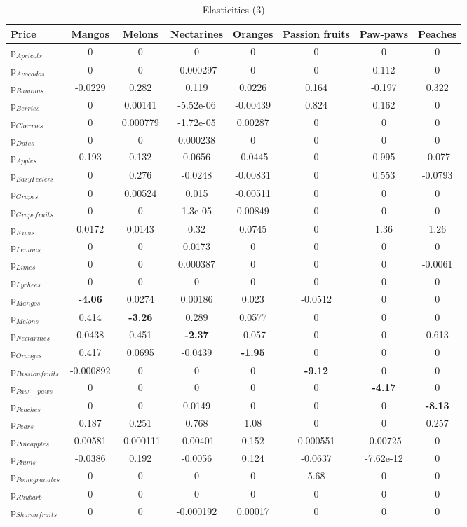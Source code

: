 \documentclass[11pt]{article}
\begin{document}
\begin{table}[h]
\caption{Elasticities (3)}
\label{table:elasticities 3}
\begin{center}
\begin{tabular}{lccccccc} \hline \hline
Price &Mangos &Melons &Nectarines &Oranges &Passion fruits &Paw-paws &Peaches \\ \hline
p$_{Apricots}$ &0 &0 &0 &0 &0 &0 &0 \\
p$_{Avocados}$ &0 &0 &-0.000297 &0 &0 &0.112 &0 \\
p$_{Bananas}$ &-0.0229 &0.282 &0.119 &0.0226 &0.164 &-0.197 &0.322 \\
p$_{Berries}$ &0 &0.00141 &-5.52e-06 &-0.00439 &0.824 &0.162 &0 \\
p$_{Cherries}$ &0 &0.000779 &-1.72e-05 &0.00287 &0 &0 &0 \\
p$_{Dates}$ &0 &0 &0.000238 &0 &0 &0 &0 \\
p$_{Apples}$ &0.193 &0.132 &0.0656 &-0.0445 &0 &0.995 &-0.077 \\
p$_{Easy Peelers}$ &0 &0.276 &-0.0248 &-0.00831 &0 &0.553 &-0.0793 \\
p$_{Grapes}$ &0 &0.00524 &0.015 &-0.00511 &0 &0 &0 \\
p$_{Grapefruits}$ &0 &0 &1.3e-05 &0.00849 &0 &0 &0 \\
p$_{Kiwis}$ &0.0172 &0.0143 &0.32 &0.0745 &0 &1.36 &1.26 \\
p$_{Lemons}$ &0 &0 &0.0173 &0 &0 &0 &0 \\
p$_{Limes}$ &0 &0 &0.000387 &0 &0 &0 &-0.0061 \\
p$_{Lychees}$ &0 &0 &0 &0 &0 &0 &0 \\
p$_{Mangos}$ &\textbf{-4.06} &0.0274 &0.00186 &0.023 &-0.0512 &0 &0 \\
p$_{Melons}$ &0.414 &\textbf{-3.26} &0.289 &0.0577 &0 &0 &0 \\
p$_{Nectarines}$ &0.0438 &0.451 &\textbf{-2.37} &-0.057 &0 &0 &0.613 \\
p$_{Oranges}$ &0.417 &0.0695 &-0.0439 &\textbf{-1.95} &0 &0 &0 \\
p$_{Passion fruits}$ &-0.000892 &0 &0 &0 &\textbf{-9.12} &0 &0 \\
p$_{Paw-paws}$ &0 &0 &0 &0 &0 &\textbf{-4.17} &0 \\
p$_{Peaches}$ &0 &0 &0.0149 &0 &0 &0 &\textbf{-8.13} \\
p$_{Pears}$ &0.187 &0.251 &0.768 &1.08 &0 &0 &0.257 \\
p$_{Pineapples}$ &0.00581 &-0.000111 &-0.00401 &0.152 &0.000551 &-0.00725 &0 \\
p$_{Plums}$ &-0.0386 &0.192 &-0.0056 &0.124 &-0.0637 &-7.62e-12 &0 \\
p$_{Pomegranates}$ &0 &0 &0 &0 &5.68 &0 &0 \\
p$_{Rhubarb}$ &0 &0 &0 &0 &0 &0 &0 \\
p$_{Sharon fruits}$ &0 &0 &-0.000192 &0.00017 &0 &0 &0 \\
\end{tabular}
\end{center}
\end{table}
\end{document}
